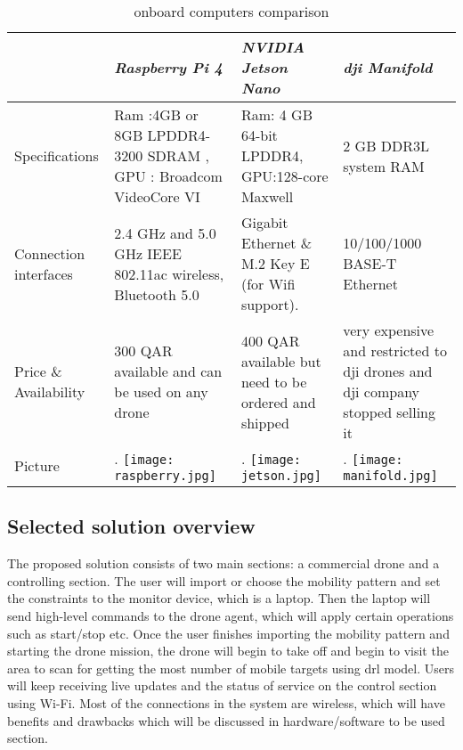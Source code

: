 \documentclass[../main.tex]{subfiles}
\begin{document}
\begin{table}[hbt!]
	\begin{tabular}{ | p{3cm} | p{4cm}| p{4cm} | p{4cm} |}
		\hline
		\textit{} & \textit{Raspberry Pi 4} & \textit{NVIDIA Jetson Nano} & \textit{dji Manifold}\\ \hline
		Specifications  & Ram :4GB or 8GB LPDDR4-3200 SDRAM , GPU : Broadcom VideoCore VI & Ram: 4 GB 64-bit LPDDR4, GPU:128-core Maxwell & 2 GB DDR3L system RAM  \\ \hline
		Connection interfaces & 2.4 GHz and 5.0 GHz IEEE 802.11ac wireless, Bluetooth 5.0 & Gigabit Ethernet \& M.2 Key E (for Wifi support). &10/100/1000 BASE-T Ethernet \\ \hline
		
		Price \& Availability & 300 QAR available and can be used on any drone & 400 QAR available but need to be ordered and shipped & very expensive and restricted to dji drones and dji company stopped selling it    \\ \hline
		Picture & \begin{minipage}{.2\textwidth}.
			\texttt{[image: raspberry.jpg]}
		\end{minipage}  & \begin{minipage}{.2\textwidth}.
		\texttt{[image: jetson.jpg]}
	\end{minipage} & \begin{minipage}{.2\textwidth}.
	\texttt{[image: manifold.jpg]}
\end{minipage} \\ \hline
		
		
		
	\end{tabular}
	\caption{onboard computers comparison}
\end{table} \label{tab: onboard computers }  
\newpage
\subsection{Selected solution overview}

The proposed solution consists of two main sections: a commercial drone and a controlling section. The user will import or choose the mobility pattern and set the constraints to the monitor device, which is a laptop. Then the laptop will send high-level commands to the drone agent, which will apply certain operations such as start/stop etc. Once the user finishes importing the mobility pattern and starting the drone mission, the drone will begin to take off and begin to visit the area to scan for getting the most number of mobile targets using \gls{drl} model. Users will keep receiving live updates and the status of service on the control section using Wi-Fi. Most of the connections in the system are wireless, which will have benefits and drawbacks which will be discussed in hardware/software to be used section.
\end{document}
